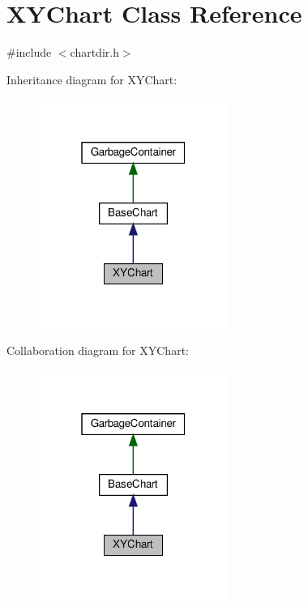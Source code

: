 \hypertarget{class_x_y_chart}{}\section{X\+Y\+Chart Class Reference}
\label{class_x_y_chart}


{\ttfamily \#include $<$chartdir.\+h$>$}



Inheritance diagram for X\+Y\+Chart\+:
\nopagebreak
\begin{figure}[H]
\begin{center}
\leavevmode
\includegraphics[width=175pt]{class_x_y_chart__inherit__graph}
\end{center}
\end{figure}


Collaboration diagram for X\+Y\+Chart\+:
\nopagebreak
\begin{figure}[H]
\begin{center}
\leavevmode
\includegraphics[width=175pt]{class_x_y_chart__coll__graph}
\end{center}
\end{figure}
